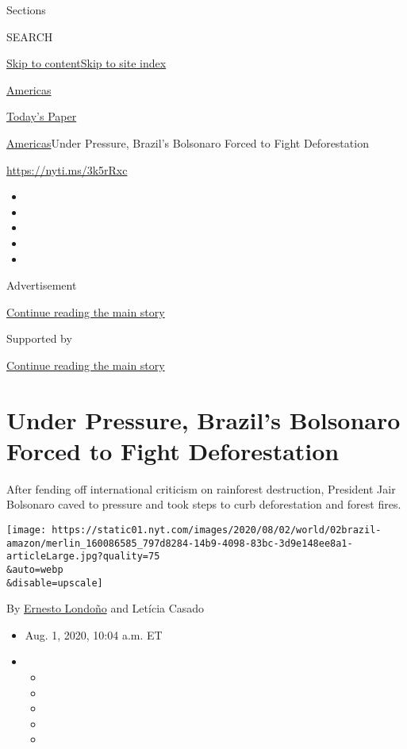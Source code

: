 Sections

SEARCH

\protect\hyperlink{site-content}{Skip to
content}\protect\hyperlink{site-index}{Skip to site index}

\href{https://www.nytimes.com/section/world/americas}{Americas}

\href{https://myaccount.nytimes.com/auth/login?response_type=cookie\&client_id=vi}{}

\href{https://www.nytimes.com/section/todayspaper}{Today's Paper}

\href{/section/world/americas}{Americas}\textbar{}Under Pressure,
Brazil's Bolsonaro Forced to Fight Deforestation

\url{https://nyti.ms/3k5rRxc}

\begin{itemize}
\item
\item
\item
\item
\item
\end{itemize}

Advertisement

\protect\hyperlink{after-top}{Continue reading the main story}

Supported by

\protect\hyperlink{after-sponsor}{Continue reading the main story}

\hypertarget{under-pressure-brazils-bolsonaro-forced-to-fight-deforestation}{%
\section{Under Pressure, Brazil's Bolsonaro Forced to Fight
Deforestation}\label{under-pressure-brazils-bolsonaro-forced-to-fight-deforestation}}

After fending off international criticism on rainforest destruction,
President Jair Bolsonaro caved to pressure and took steps to curb
deforestation and forest fires.

\texttt{[image: https://static01.nyt.com/images/2020/08/02/world/02brazil-amazon/merlin\_160086585\_797d8284-14b9-4098-83bc-3d9e148ee8a1-articleLarge.jpg?quality=75\\\&auto=webp\\\&disable=upscale]}

By \href{https://www.nytimes.com/by/ernesto-londono}{Ernesto Londoño}
and Letícia Casado

\begin{itemize}
\item
  Aug. 1, 2020, 10:04 a.m. ET
\item
  \begin{itemize}
  \item
  \item
  \item
  \item
  \item
  \end{itemize}
\end{itemize}

